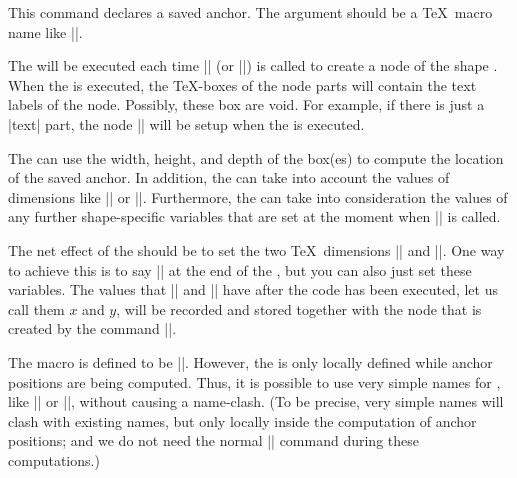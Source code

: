 \begin{command}{\pgfdeclareshape{}}
  \begin{command}{\savedanchor{}}
    This command declares a saved anchor. The argument 
    should be a \TeX\ macro name like |\centerpoint|.

    The  will be executed each time |\pgfnode| (or
    |\pgfmultipartnode|) is called to  create a node of the shape
    . When the  
    is executed, the \TeX-boxes of the node parts will contain the
    text labels of the node. Possibly, these box are void. For
    example, if there is just a |text| part, the node
    |\pgfnodeparttextbox| will be setup when the  is
    executed. 

    The  can use the width, height, and depth of the
    box(es) to compute the location of the saved anchor. In addition,
    the  can take into account the values of dimensions like
    |\pgfshapeminwidth| or |\pgfshapeinnerxsep|. Furthermore, the
     can take into consideration the values of any further
    shape-specific variables that are set at the moment when
    |\pgfnode| is called.

    The net effect of the  should be to set the two \TeX\
    dimensions |\pgf@x| and |\pgf@y|. One way to achieve this is to
    say |\pgfpoint{|\meta{x value}|}{|\meta{y value}|}| at the end of
    the \meta{code}, but you can also just set these variables.
    The values that |\pgf@x| and |\pgf@y| have after the code has been
    executed, let us call them $x$ and $y$, will be recorded and
    stored together with the node that is created by the command
    |\pgfnode|.

    The macro  is defined to be
    ||. However, the  is only
    locally defined while anchor positions are being computed. Thus,
    it is possible to use very simple names for , like
    |\center| or |\a|, without causing a name-clash. (To be precise,
    very simple \meta{command} names will clash with existing names,
    but only locally inside the computation of anchor positions; and
    we do not need the normal |\center| command during these
    computations.)


\end{command}
\end{command}
